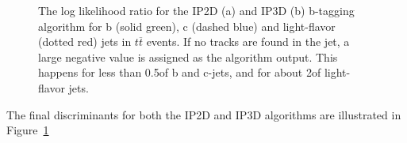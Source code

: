 \begin{figure}
\caption{The log likelihood ratio for the IP2D (a) and IP3D (b) b-tagging algorithm for b (solid green),
c (dashed blue) and light-flavor (dotted red) jets in $t \overline{t}$ events. If no tracks are found in the jet, a large
negative value is assigned as the algorithm output. This happens for less than 0.5\percent of b and c-jets, and
for about 2\percent of light-flavor jets.}
\label{pic:ipxd}
\end{figure}
The final discriminants for both the IP2D and IP3D algorithms are illustrated in Figure~\ref{pic:ipxd}

